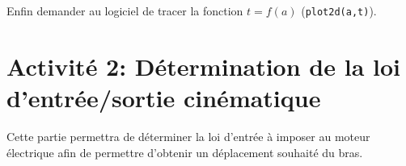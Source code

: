 Enfin demander au logiciel de tracer la fonction $t=f(a)$ (\texttt{plot2d(a,t)}).
%
%
%
%
%

\section{Activité 2: Détermination de la loi d'entrée/sortie cinématique}

Cette partie permettra de déterminer la loi d'entrée à imposer au moteur électrique afin de permettre d'obtenir un déplacement souhaité du bras.


